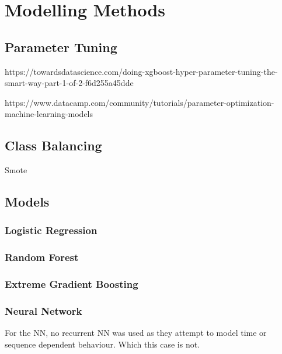 \chapter{Modelling Methods} 
\label{Chapter4}


\section{Parameter Tuning}

https://towardsdatascience.com/doing-xgboost-hyper-parameter-tuning-the-smart-way-part-1-of-2-f6d255a45dde

https://www.datacamp.com/community/tutorials/parameter-optimization-machine-learning-models

\section{Class Balancing}

Smote 

\section{Models}

\subsection{Logistic Regression}

\subsection{Random Forest}

\subsection{Extreme Gradient Boosting}

\subsection{Neural Network}

For the NN, no recurrent NN was used as they attempt to model time or sequence dependent behaviour. Which this case is not. 